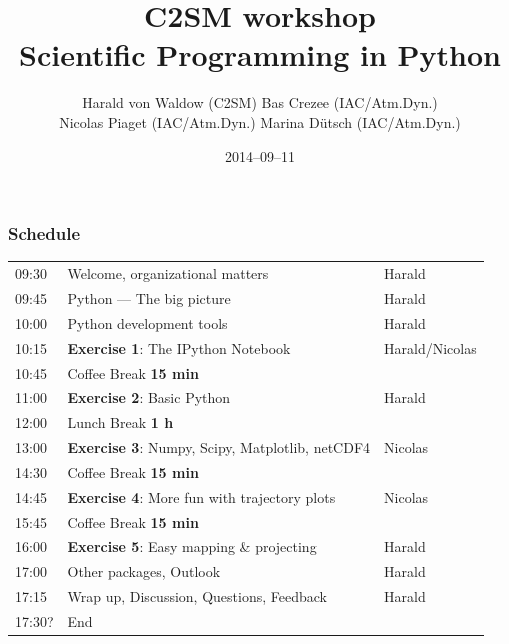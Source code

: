 \documentclass[xcolor=pdftex,dvipsnames,table]{beamer}
\title{C2SM workshop\\Scientific Programming in Python}
\author{
  Harald von Waldow {\tiny(C2SM)}\hfill
  Bas Crezee {\tiny(IAC/Atm.Dyn.)}\hfill\\
  Nicolas Piaget {\tiny(IAC/Atm.Dyn.)}\hfill
  Marina Dütsch {\tiny(IAC/Atm.Dyn.)}
}
\date{2014--09--11}
\begin{document}

\begin{frame}
  \titlepage%
\end{frame}


\usebackgroundtemplate{}
\begin{frame}
  \frametitle{Schedule}

\small{
\begin{tabular}{p{1cm}|l|p{2cm}}

  \rowcolor{lightgray}09:30 & Welcome, organizational matters & Harald\\
  \rowcolor{lightgray}09:45 & Python --- The big picture & Harald\\

  \rowcolor{lightgray}10:00 & Python development tools & Harald\\
  \rowcolor{cyan}10:15 & \textbf{Exercise 1}: The IPython Notebook & Harald/Nicolas\\
  \rowcolor{orange}10:45 & Coffee Break \textbf{15 min}&\\
  \rowcolor{cyan}11:00 & \textbf{Exercise 2}: Basic Python & Harald\\
  \rowcolor{orange}12:00 & Lunch Break \textbf{1 h} &\\
  \rowcolor{cyan}13:00 & \textbf{Exercise 3}: Numpy, Scipy, Matplotlib, netCDF4 & Nicolas\\
  \rowcolor{orange}14:30 & Coffee Break \textbf{15 min}&\\
  \rowcolor{cyan}14:45 & \textbf{Exercise 4}: More fun with trajectory plots & Nicolas\\
  \rowcolor{orange}15:45 & Coffee Break \textbf{15 min}&\\
  \rowcolor{cyan}16:00 & \textbf{Exercise 5}: Easy mapping \& projecting & Harald\\
  \rowcolor{lightgray}17:00 & Other packages, Outlook & Harald\\
  \rowcolor{lightgray}17:15 & Wrap up, Discussion, Questions, Feedback & Harald\\
  \rowcolor{lightgray}17:30? & End &\\

\end{tabular}
}
\end{frame}
\end{document}
